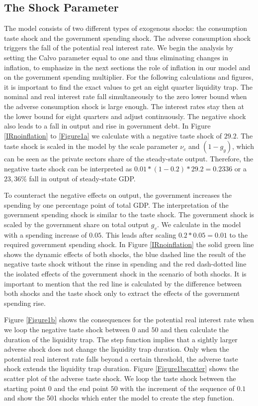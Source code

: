 \documentclass[12pt,a4paper,oneside,titlepage]{article}
\begin{document}
\subsection*{The Shock Parameter}
The model consists of two different types of exogenous shocks: the consumption taste shock and the government spending shock. The adverse consumption shock triggers the fall of the potential real interest rate. We begin the analysis by setting the Calvo parameter equal to one and thus eliminating changes in inflation, to emphasize in the next sections the role of inflation in our model and on the government spending multiplier. For the following calculations and figures, it is important to find the exact values to get an eight quarter liquidity trap. The nominal and real interest rate fall simultaneously to the zero lower bound when the adverse consumption shock is large enough. The interest rates stay then at the lower bound for eight quarters and adjust continuously. The negative shock also leads to a fall in output and rise in government debt. In Figure \ref{IRnoinflation} to \ref{Figure1a} we calculate with a negative taste shock of $29.2$. The taste shock is scaled in the model by the scale parameter $\nu_c$ and $\left(1- g_y\right)$, which can be seen as the private sectors share of the steady-state output. Therefore, the negative taste shock can be interpreted as $0.01 * \left(1-0.2\right) * 29.2 = 0.2336$ or a $23,36\%$ fall in output of steady-state GDP.
\par
\bigskip
To counteract the negative effects on output, the government increases the spending by one percentage point of total GDP. The interpretation of the government spending shock is similar to the taste shock.  The government shock is scaled by the government share on total output $g_v$. We calculate in the model with a spending increase of $0.05$. This leads after scaling $0.2 * 0.05 = 0.01$ to the required government spending shock.
In Figure \ref{IRnoinflation} the solid green line shows the dynamic effects of both shocks, the blue dashed line the result of the negative taste shock without the rinse in spending and the red dash-dotted line the isolated effects of the government shock in the scenario of both shocks. It is important to mention that the red line is calculated by the difference between both shocks and the taste shock only to extract the effects of the government spending rise.
\par
\bigskip
Figure \ref{Figure1b} shows the consequences for the potential real interest rate when we loop the negative taste shock between $0$ and $50$ and then calculate the duration of the liquidity trap. The step function implies that a sightly larger adverse shock does not change the liquidity trap duration. Only when the potential real interest rate falls beyond a certain threshold, the adverse taste shock extends the liquidity trap duration. Figure \ref{Figure1bscatter} shows the scatter plot of the adverse taste shock. We loop the taste shock between the starting point $0$ and the end point $50$ with the increment of the sequence of $0.1$ and show the 501 shocks which enter the model to create the step function.
\end{document}
